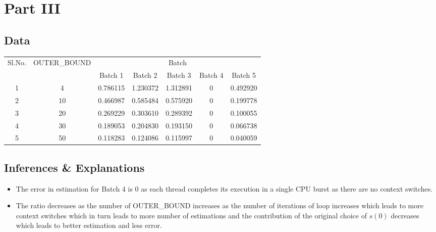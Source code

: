 \documentclass{article}
\begin{document}
\section{Part III}
\subsection{Data}
\begin{center}
    \begin{tabular}{| c | c | c | c | c | c | c |}
    \hline
    \multirow{2}{*}{Sl.No.} & \multirow{2}{*}{OUTER\_BOUND} & \multicolumn{5}{|c|}{Batch}\\ \cline{3-7}
    
     &  & Batch 1 & Batch 2 & Batch 3 & Batch 4 & Batch 5\\ \hline
     1 & 4 & 0.786115 & 1.230372 & 1.312891 & 0 & 0.492920 \\
     2 & 10 & 0.466987 & 0.585484 & 0.575920 & 0 & 0.199778\\
     3 & 20 & 0.269229 & 0.303610 & 0.289392 & 0 & 0.100055\\
     4 & 30 & 0.189053 & 0.204830 & 0.193150 & 0 & 0.066738\\
     5 & 50 & 0.118283 & 0.124086 & 0.115997 & 0 & 0.040059\\
    \hline
    \end{tabular}
\end{center}
\subsection{Inferences \& Explanations}
\begin{itemize}
  \item The error in estimation for Batch 4 is $0$ as each thread completes its execution in a single CPU burst as there are no context switches.
  \item The ratio decreases as the number of OUTER\_BOUND increases as the number of iterations of loop increases which leads to more context switches which in turn leads to more number of estimations and the contribution of the original choice of $s(0)$ decreases which leads to better estimation and less error.
\end{itemize}
\end{document}
